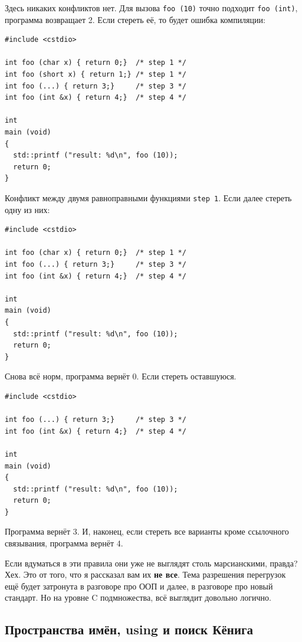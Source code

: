 \documentclass[a4paper,12pt,oneside]{article}
\begin{document}
Здесь никаких конфликтов нет. Для вызова \lstinline!foo (10)! точно подходит \lstinline!foo (int)!, программа возвращает 2.
Если стереть её, то будет ошибка компиляции:

\begin{lstlisting}
#include <cstdio>

int foo (char x) { return 0;}  /* step 1 */
int foo (short x) { return 1;} /* step 1 */
int foo (...) { return 3;}     /* step 3 */
int foo (int &x) { return 4;}  /* step 4 */

int
main (void)
{
  std::printf ("result: %d\n", foo (10));
  return 0;
}
\end{lstlisting}

Конфликт между двумя равноправными функциями \lstinline!step 1!. Если далее стереть одну из них:

\begin{lstlisting}
#include <cstdio>

int foo (char x) { return 0;}  /* step 1 */
int foo (...) { return 3;}     /* step 3 */
int foo (int &x) { return 4;}  /* step 4 */

int
main (void)
{
  std::printf ("result: %d\n", foo (10));
  return 0;
}
\end{lstlisting}

Снова всё норм, программа вернёт 0. Если стереть оставшуюся.

\begin{lstlisting}
#include <cstdio>

int foo (...) { return 3;}     /* step 3 */
int foo (int &x) { return 4;}  /* step 4 */

int
main (void)
{
  std::printf ("result: %d\n", foo (10));
  return 0;
}
\end{lstlisting}

Программа вернёт 3. И, наконец, если стереть все варианты кроме ссылочного связывания, программа вернёт 4.

Если вдуматься в эти правила они уже не выглядят столь марсианскими, правда? Хех. Это от того, что я рассказал вам их \textbf{не все}. Тема разрешения перегрузок ещё будет затронута в разговоре про ООП и далее, в разговоре про новый стандарт. Но на уровне C подмножества, всё выглядит довольно логично.

\subsection{Пространства имён, using и поиск Кёнига}
\end{document}
